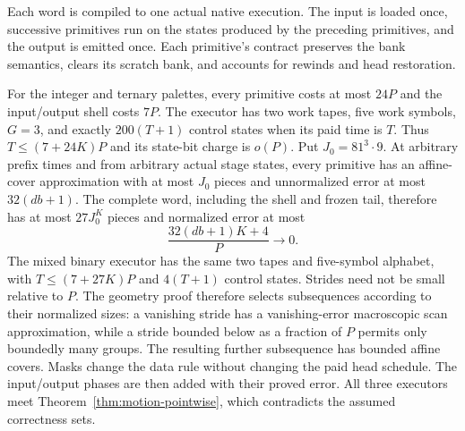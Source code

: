\begin{proofoutline}
Each word is compiled to one actual native execution.  The input is loaded
once, successive primitives run on the states produced by the preceding
primitives, and the output is emitted once.  Each primitive's contract
preserves the bank semantics, clears its scratch bank, and accounts for
rewinds and head restoration.

For the integer and ternary palettes, every primitive costs at most $24P$
and the input/output shell costs $7P$.  The executor has two work tapes, five
work symbols, $G=3$, and exactly $200(T+1)$ control states when its paid time
is $T$.  Thus $T\le(7+24K)P$ and its state-bit charge is $o(P)$.
Put $J_0=81^3\cdot9$.  At arbitrary prefix times and from arbitrary actual
stage states, every primitive has an affine-cover approximation with at most
$J_0$ pieces and unnormalized error at most $32(db+1)$.  The complete word,
including the shell and frozen tail, therefore has at most
$27J_0^K$ pieces and normalized error at most
\[
 \frac{32(db+1)K+4}{P}\longrightarrow0.
\]
The mixed binary executor has the same two tapes and five-symbol alphabet,
with $T\le(7+27K)P$ and $4(T+1)$ control states.  Strides need not be small
relative to $P$.  The geometry proof therefore selects subsequences according
to their normalized sizes: a vanishing stride has a vanishing-error
macroscopic scan approximation, while a stride bounded below as a fraction of
$P$ permits only boundedly many groups.  The resulting further subsequence
has bounded affine covers.  Masks change the data rule without changing the
paid head schedule.  The input/output phases are then added with their proved
error.  All three executors meet Theorem~\ref{thm:motion-pointwise}, which
contradicts the assumed correctness sets.
\end{proofoutline}

